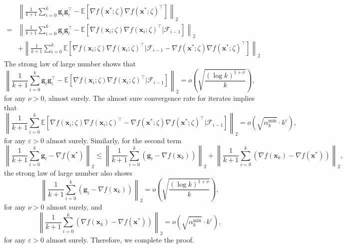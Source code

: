 \documentclass[aos]{imsart}
\numberwithin{equation}{section}
\theoremstyle{plain}
\begin{document}
\begin{appendix}
    \begin{equation*}
        \begin{split}
            & \left\|  \frac{1}{k+1}\sum_{i=0}^{k} \bm{g}_i  \bm{g}_i^{\top} - \mathbb{E} \left[ \nabla f(\bm{x}^{*};\zeta)   \nabla f(\bm{x}^{*};\zeta)^{\top} \right]\right\|_2 \\
            = & \left\|  \frac{1}{k+1}\sum_{i=0}^{k} \bm{g}_i  \bm{g}_i^{\top} - \mathbb{E} \left[ \nabla f(\bm{x}_{i};\zeta)   \nabla f(\bm{x}_{i};\zeta)^{\top} | \mathcal{F}_{i-1}\right]\right\|_2 \\
            & + \left\|  \frac{1}{k+1}\sum_{i=0}^{k}   \mathbb{E} \left[ \nabla f(\bm{x}_{i};\zeta)   \nabla f(\bm{x}_{i};\zeta)^{\top} | \mathcal{F}_{i-1} - \nabla f(\bm{x}^{*};\zeta)   \nabla f(\bm{x}^{*};\zeta)^{\top} \right]\right\|_2
        \end{split}
    \end{equation*}
    The strong law of large number shows that
    \begin{equation*}
         \left\|  \frac{1}{k+1}\sum_{i=0}^{k} \bm{g}_i  \bm{g}_i^{\top} - \mathbb{E} \left[ \nabla f(\bm{x}_{i};\zeta)   \nabla f(\bm{x}_{i};\zeta)^{\top} | \mathcal{F}_{i-1}\right]\right\|_2 = o\left( \sqrt{\frac{\left( \log k \right)^{1+\nu}}{k}} \right),
    \end{equation*}
    for any $\nu >0$, almost surely. The almost sure convergence rate for iterates implies that 
    \begin{equation*}
        \left\|  \frac{1}{k+1}\sum_{i=0}^{k}   \mathbb{E} \left[ \nabla f(\bm{x}_{i};\zeta)   \nabla f(\bm{x}_{i};\zeta)^{\top} - \nabla f(\bm{x}^{*};\zeta)   \nabla f(\bm{x}^{*};\zeta)^{\top} | \mathcal{F}_{i-1} \right]\right\|_2 = o\left( \sqrt{\alpha^{\min}_k} \cdot k^{\varepsilon} \right),
    \end{equation*}
    for any $\varepsilon >0$ almost surely. Similarly, for the second term
    \begin{equation*}
        \left\|\frac{1}{k+1}\sum_{i=0}^{k} \bm{g}_i - \nabla f(\bm{x}^{*}) \right\|_2 \leq   \left\|\frac{1}{k+1}\sum_{i=0}^{k} \left( \bm{g}_i - \nabla f(\bm{x}_{k}) \right) \right\|_2 +  \left\|\frac{1}{k+1}\sum_{i=0}^{k}  \left(\nabla f(\bm{x}_{k})  - \nabla f(\bm{x}^{*})  \right) \right\|_2,
    \end{equation*}
    the strong law of large number also shows
    \begin{equation*}
        \left\|\frac{1}{k+1}\sum_{i=0}^{k} \left( \bm{g}_i - \nabla f(\bm{x}_{k}) \right) \right\|_2 = o\left( \sqrt{\frac{\left( \log k \right)^{1+\nu}}{k}} \right),
    \end{equation*}
    for any $\nu > 0$ almost surely, 
    and
    \begin{equation*}
        \left\|\frac{1}{k+1}\sum_{i=0}^{k}  \left(\nabla f(\bm{x}_{k})  - \nabla f(\bm{x}^{*})  \right) \right\|_2 = o\left( \sqrt{\alpha^{\min}_k} \cdot k^{\varepsilon} \right),
    \end{equation*}
    for any $\varepsilon >0$ almost surely. Therefore, we complete the proof. 

    
\end{appendix}
\end{document}
